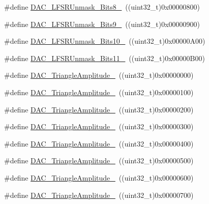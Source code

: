 \begin{DoxyCompactItemize}
\#define \mbox{\hyperlink{group___d_a_c__lfsrunmask__triangleamplitude_ga4f56965841d9d91ca5b6de43ee589598}{D\+A\+C\+\_\+\+L\+F\+S\+R\+Unmask\+\_\+\+Bits8\+\_}}~((uint32\+\_\+t)0x00000800)
\item 
\#define \mbox{\hyperlink{group___d_a_c__lfsrunmask__triangleamplitude_gaf7f4540d9ec6efe074e1e4485f9a347a}{D\+A\+C\+\_\+\+L\+F\+S\+R\+Unmask\+\_\+\+Bits9\+\_}}~((uint32\+\_\+t)0x00000900)
\item 
\#define \mbox{\hyperlink{group___d_a_c__lfsrunmask__triangleamplitude_ga7670f0e10f062571d0e56027ef653228}{D\+A\+C\+\_\+\+L\+F\+S\+R\+Unmask\+\_\+\+Bits10\+\_}}~((uint32\+\_\+t)0x00000\+A00)
\item 
\#define \mbox{\hyperlink{group___d_a_c__lfsrunmask__triangleamplitude_gaeb9b5992b771f9a14587eeda58227831}{D\+A\+C\+\_\+\+L\+F\+S\+R\+Unmask\+\_\+\+Bits11\+\_}}~((uint32\+\_\+t)0x00000\+B00)
\item 
\#define \mbox{\hyperlink{group___d_a_c__lfsrunmask__triangleamplitude_ga49b1eddf4e6371b4be8751162dc94ac4}{D\+A\+C\+\_\+\+Triangle\+Amplitude\+\_}}~((uint32\+\_\+t)0x00000000)
\item 
\#define \mbox{\hyperlink{group___d_a_c__lfsrunmask__triangleamplitude_ga9798d68c3bbf0a57306bf2f962697377}{D\+A\+C\+\_\+\+Triangle\+Amplitude\+\_}}~((uint32\+\_\+t)0x00000100)
\item 
\#define \mbox{\hyperlink{group___d_a_c__lfsrunmask__triangleamplitude_gad3f31de1277836df1109576a53c47e87}{D\+A\+C\+\_\+\+Triangle\+Amplitude\+\_}}~((uint32\+\_\+t)0x00000200)
\item 
\#define \mbox{\hyperlink{group___d_a_c__lfsrunmask__triangleamplitude_ga42653712ce783d33ecb2f3e97e9c2ece}{D\+A\+C\+\_\+\+Triangle\+Amplitude\+\_}}~((uint32\+\_\+t)0x00000300)
\item 
\#define \mbox{\hyperlink{group___d_a_c__lfsrunmask__triangleamplitude_ga10b15745b749c62a56bd3d7bd5a27e1b}{D\+A\+C\+\_\+\+Triangle\+Amplitude\+\_}}~((uint32\+\_\+t)0x00000400)
\item 
\#define \mbox{\hyperlink{group___d_a_c__lfsrunmask__triangleamplitude_gaaae92dae9c4da55e29c645396825e36b}{D\+A\+C\+\_\+\+Triangle\+Amplitude\+\_}}~((uint32\+\_\+t)0x00000500)
\item 
\#define \mbox{\hyperlink{group___d_a_c__lfsrunmask__triangleamplitude_gaacec0af3f69db46f8984be3af9ecadfb}{D\+A\+C\+\_\+\+Triangle\+Amplitude\+\_}}~((uint32\+\_\+t)0x00000600)
\item 
\#define \mbox{\hyperlink{group___d_a_c__lfsrunmask__triangleamplitude_gadb404422c86a7b92d78e6d9617e8ce4d}{D\+A\+C\+\_\+\+Triangle\+Amplitude\+\_}}~((uint32\+\_\+t)0x00000700)

\end{DoxyCompactItemize}
